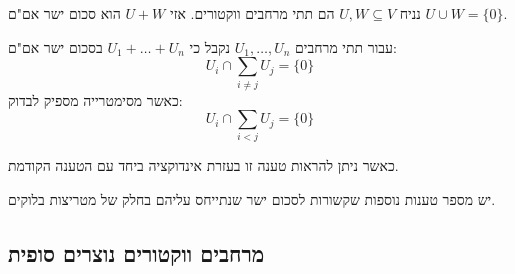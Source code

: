 \documentclass{tstextbook}
\begin{document}
\begin{proposition}
נניח \(U,W \subseteq V\) הם תתי מרחבים ווקטורים. אזי \(U+W\) הוא סכום ישר אם"ם \(U\cup W=\{ 0 \}\).

\end{proposition}
\begin{corollary}
עבור תתי מרחבים \(U_{1},\dots,U_{n}\) נקבל כי \(U_{1}+\dots+U_{n}\) בסכום ישר אם"ם:
$$U_{i}\cap\sum_{i\neq j}U_{j}=\{ 0 \}$$
כאשר מסימטרייה מספיק לבדוק:
$$ U_{i}\cap\sum_{i<j}U_{j}=\{ 0 \}$$

\end{corollary}
כאשר ניתן להראות טענה זו בעזרת אינדוקציה ביחד עם הטענה הקודמת.

\begin{remark}
יש מספר טענות נוספות שקשורות לסכום ישר שנתייחס עליהם בחלק של מטריצות בלוקים.

\end{remark}
\subsection{מרחבים ווקטורים נוצרים סופית}
\end{document}

